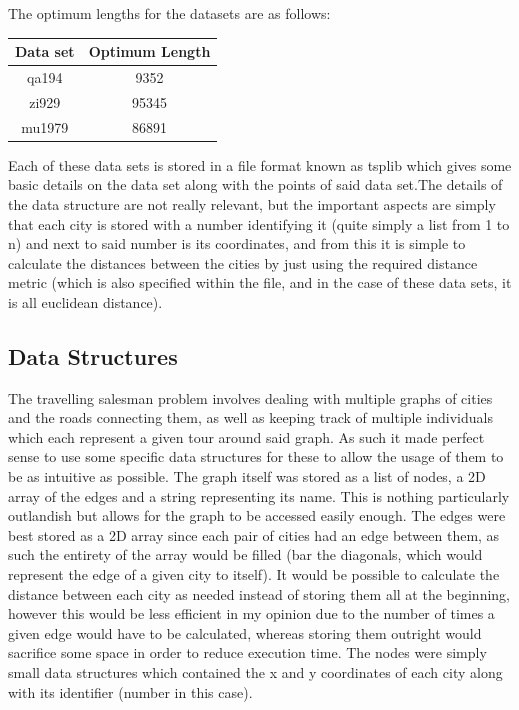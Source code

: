 \documentclass[11pt,a4paper,titlepage]{article}
\begin{document}
The optimum lengths for the datasets are as follows:

\begin{center}
\begin{tabular}{c | c}
Data set & Optimum Length \\ [0.5ex]
\hline
	qa194 & 9352 \\
	zi929 & 95345 \\
	mu1979 & 86891
\end{tabular}
\end{center}

Each of these data sets is stored in a file format known as tsplib which gives some basic details on the data set along with the points of said data set.The details of the data structure are not really relevant, but the important aspects are simply that each city is stored with a number identifying it (quite simply a list from 1 to n) and next to said number is its coordinates, and from this it is simple to calculate the distances between the cities by just using the required distance metric (which is also specified within the file, and in the case of these data sets, it is all euclidean distance).

\subsection{Data Structures}

The travelling salesman problem involves dealing with multiple graphs of cities and the roads connecting them, as well as keeping track of multiple individuals which each represent a given tour around said graph. As such it made perfect sense to use some specific data structures for these to allow the usage of them to be as intuitive as possible. The graph itself was stored as a list of nodes, a 2D array of the edges and a string representing its name. This is nothing particularly outlandish but allows for the graph to be accessed easily enough. The edges were best stored as a 2D array since each pair of cities had an edge between them, as such the entirety of the array would be filled (bar the diagonals, which would represent the edge of a given city to itself). It would be possible to calculate the distance between each city as needed instead of storing them all at the beginning, however this would be less efficient in my opinion due to the number of times a given edge would have to be calculated, whereas storing them outright would sacrifice some space in order to reduce execution time. The nodes were simply small data structures which contained the x and y coordinates of each city along with its identifier (number in this case).
\end{document}
